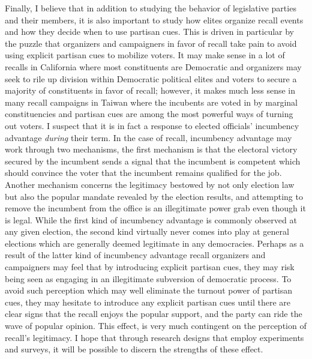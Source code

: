 \documentclass[hyphens, crop=false]{standalone}
\begin{document}
	Finally,
	I believe that in addition to studying the behavior of
	legislative parties and their members,
	it is also important to study how elites organize recall
	events and how they decide when to use partisan cues.
	This is driven in particular by the puzzle that
	organizers and campaigners in favor of recall
	take pain to avoid using explicit partisan cues
	to mobilize voters.
	It may make sense in a lot of recalls
	in California where most constituents
	are Democratic and organizers may seek to rile up
	division within Democratic political elites and voters
	to secure a majority of constituents in favor of recall;
	however, it makes much less sense
	in many recall campaigns in Taiwan
	where the incubents are voted in by marginal constituencies
	and partisan cues are among the most powerful ways
	of turning out voters.
	I suspect that it is in fact
	a response to elected officials'
	incumbency advantage
	\textit{during} their term.
	In the case of recall,
	incumbency advantage may work through two mechanisms,
	the first mechanism is that
	the electoral victory secured by the incumbent
	sends a signal that the incumbent is competent
	which should convince the voter that the incumbent remains qualified for the job.
	Another mechanism concerns the
	legitimacy bestowed by not only election law
	but also the popular mandate revealed by the election results,
	and attempting to remove the incumbent from the office
	is an illegitimate power grab
	even though it is legal.
	While the first kind of incumbency advantage
	is commonly observed at any given election,
	the second kind virtually never comes into play
	at general elections which are generally deemed legitimate
	in any democracies.
	Perhaps as a result of the latter kind of incumbency advantage
	recall organizers and campaigners may feel that
	by introducing explicit partisan cues,
	they may risk being seen as engaging in an illegitimate subversion of democratic process.
	To avoid such perception which may well eliminate the turnout power of partisan cues,
	they may hesitate to introduce any explicit partisan cues
	until there are clear signs that the recall enjoys the popular support,
	and the party can ride the wave of popular opinion.
	This effect,
	is very much contingent on the perception of recall's legitimacy.
	I hope that through research designs that employ experiments and surveys,
	it will be possible to discern the strengths of these effect.
	
	
	
	
\end{document}
